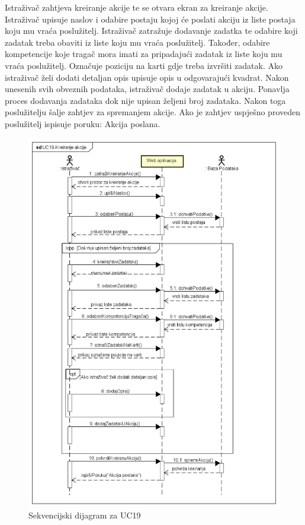 				{Istraživač zahtjeva kreiranje akcije te se otvara ekran za kreiranje akcije. Istraživač upisuje naslov i odabire postaju kojoj će poslati akciju iz liste postaja koju mu vraća poslužitelj. Istraživač zatražuje dodavanje zadatka te odabire koji zadatak treba obaviti iz liste koju mu vraća poslužitelj. Također, odabire kompetencije koje tragač mora imati za pripadajući zadatak iz liste koju mu vraća poslužitelj. Označuje poziciju na karti gdje treba izvršiti zadatak. Ako istraživač želi dodati detaljan opis upisuje opis u odgovarajući kvadrat. Nakon unesenih svih obveznih podataka, istraživač dodaje zadatak u akciju. Ponavlja proces dodavanja zadataka dok nije upisan željeni broj zadataka. Nakon toga poslužitelju šalje zahtjev za spremanjem akcije. Ako je zahtjev uspješno proveden poslužitelj ispisuje poruku: Akcija poslana.}
				\begin{figure}[H]
					\includegraphics[width=\textwidth]{slike/UC19-KreiranjeAkcije} %
					\caption{Sekvencijski dijagram za UC19}
					\label{fig:promjene2} %
				\end{figure}
				\eject
				
